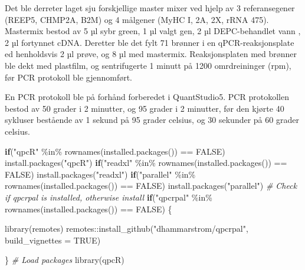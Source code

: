\documentclass[
]{book}
\newenvironment{Shaded}{\begin{snugshade}}{\end{snugshade}}
\newcommand{\AttributeTok}[1]{\textcolor[rgb]{0.77,0.63,0.00}{#1}}
\newcommand{\CommentTok}[1]{\textcolor[rgb]{0.56,0.35,0.01}{\textit{#1}}}
\newcommand{\ConstantTok}[1]{\textcolor[rgb]{0.00,0.00,0.00}{#1}}
\newcommand{\ControlFlowTok}[1]{\textcolor[rgb]{0.13,0.29,0.53}{\textbf{#1}}}
\newcommand{\FunctionTok}[1]{\textcolor[rgb]{0.00,0.00,0.00}{#1}}
\newcommand{\NormalTok}[1]{#1}
\newcommand{\SpecialCharTok}[1]{\textcolor[rgb]{0.00,0.00,0.00}{#1}}
\newcommand{\StringTok}[1]{\textcolor[rgb]{0.31,0.60,0.02}{#1}}
\begin{document}
Det ble derreter laget sju forskjellige master mixer ved hjelp av 3 referansegener (REEP5, CHMP2A, B2M) og 4 målgener (MyHC I, 2A, 2X, rRNA 475). Mastermix bestod av 5 µl sybr green, 1 µl valgt gen, 2 µl DEPC-behandlet vann , 2 µl fortynnet cDNA. Deretter ble det fylt 71 brønner i en qPCR-reaksjonsplate ed henholdsvis 2 µl prøve, og 8 µl med mastermix. Reaksjonsplaten med brønner ble dekt med plastfilm, og sentrifugerte 1 minutt på 1200 omrdreininger (rpm), før PCR protokoll ble gjennomført.

En PCR protokoll ble på forhånd forberedet i QuantStudio5. PCR protokollen bestod av 50 grader i 2 minutter, og 95 grader i 2 minutter, før den kjørte 40 sykluser bestående av 1 sekund på 95 grader celsius, og 30 sekunder på 60 grader celsius.

\begin{Shaded}
\begin{Highlighting}[]
\ControlFlowTok{if}\NormalTok{(}\StringTok{"qpcR"} \SpecialCharTok{\%in\%} \FunctionTok{rownames}\NormalTok{(}\FunctionTok{installed.packages}\NormalTok{()) }\SpecialCharTok{==} \ConstantTok{FALSE}\NormalTok{) }\FunctionTok{install.packages}\NormalTok{(}\StringTok{"qpcR"}\NormalTok{)}
\ControlFlowTok{if}\NormalTok{(}\StringTok{"readxl"} \SpecialCharTok{\%in\%} \FunctionTok{rownames}\NormalTok{(}\FunctionTok{installed.packages}\NormalTok{()) }\SpecialCharTok{==} \ConstantTok{FALSE}\NormalTok{) }\FunctionTok{install.packages}\NormalTok{(}\StringTok{"readxl"}\NormalTok{)}
\ControlFlowTok{if}\NormalTok{(}\StringTok{"parallel"} \SpecialCharTok{\%in\%} \FunctionTok{rownames}\NormalTok{(}\FunctionTok{installed.packages}\NormalTok{()) }\SpecialCharTok{==} \ConstantTok{FALSE}\NormalTok{) }\FunctionTok{install.packages}\NormalTok{(}\StringTok{"parallel"}\NormalTok{)}
\CommentTok{\# Check if qpcrpal is installed, otherwise install}
\ControlFlowTok{if}\NormalTok{(}\StringTok{"qpcrpal"} \SpecialCharTok{\%in\%} \FunctionTok{rownames}\NormalTok{(}\FunctionTok{installed.packages}\NormalTok{()) }\SpecialCharTok{==} \ConstantTok{FALSE}\NormalTok{) \{}
  
  \FunctionTok{library}\NormalTok{(remotes)}
\NormalTok{  remotes}\SpecialCharTok{::}\FunctionTok{install\_github}\NormalTok{(}\StringTok{"dhammarstrom/qpcrpal"}\NormalTok{, }\AttributeTok{build\_vignettes =} \ConstantTok{TRUE}\NormalTok{)}
  
\NormalTok{\}}
\CommentTok{\# Load packages}
\FunctionTok{library}\NormalTok{(qpcR)}
\end{Highlighting}
\end{Shaded}
\end{document}
